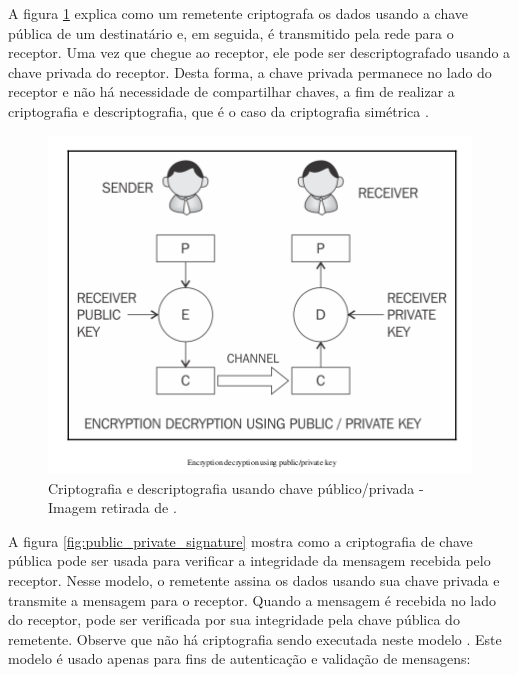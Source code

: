                 A figura \ref{fig:public_private_encryption} explica como um remetente criptografa os dados usando a chave pública de um destinatário e, em seguida, é transmitido pela rede para o receptor. Uma vez que chegue ao receptor, ele pode ser descriptografado usando a chave privada do receptor. Desta forma, a chave privada permanece no lado do receptor e não há necessidade de compartilhar chaves, a fim de realizar a criptografia e descriptografia, que é o caso da criptografia simétrica \cite{mastering_blockchain}.

                    \begin{figure}[H]
                         \centering
                         \includegraphics[scale=0.6]{figuras/capitulo_2/public_private_encryption.png}
                         \caption{Criptografia e descriptografia usando chave público/privada - Imagem retirada de \cite{mastering_blockchain}.}
                         \label{fig:public_private_encryption}
                    \end{figure}
                    
                    
                A figura \ref{fig:public_private_signature} mostra como a criptografia de chave pública pode ser usada para verificar a integridade da mensagem recebida pelo receptor. Nesse modelo, o remetente assina os dados usando sua chave privada e transmite a mensagem para o receptor. Quando a mensagem é recebida no lado do receptor, pode ser verificada por sua integridade pela chave pública do remetente. Observe que não há criptografia sendo executada neste modelo \cite{mastering_blockchain}. Este modelo é usado apenas para fins de autenticação e validação de mensagens:
                    
